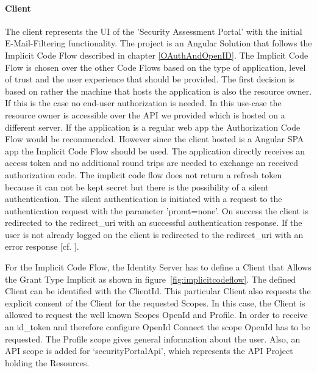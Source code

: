 \paragraph{Client}The client represents the UI of the 'Security Assessment Portal' with the initial E-Mail-Filtering functionality. The project is an Angular Solution that follows the Implicit Code Flow described in chapter \ref{OAuthAndOpenID}. The Implicit Code Flow is chosen over the other Code Flows based on the type of application, level of trust and the user experience that should be provided. The first decision is based on rather the machine that hosts the application is also the resource owner. If this is the case no end-user authorization is needed. In this use-case the resource owner is accessible over the API we provided which is hosted on a different server. If the application is a regular web app the Authorization Code Flow would be recommended. However since the client hosted is a Angular SPA app the Implicit Code Flow should be used. The application directly receives an access token and no additional round trips are needed to exchange an received authorization code. The implicit code flow does not return a refresh token because it can not be kept secret but there is the possibility of a silent authentication. The silent authentication is initiated with a request to the authentication request with the parameter 'promt=none'. On success the client is redirected to the redirect\_uri with an successful authentication response. If the user is not already logged on the client is redirected to the redirect\_uri with an error response [cf. \cite{OAuth:2018:Flow}].  


For the Implicit Code Flow, the Identity Server has to define a Client that Allows the Grant Type Implicit as shown in figure~\ref{fig:implicitcodeflow}. The defined Client can be identified with the ClientId. This particular Client also requests the explicit consent of the Client for the requested Scopes. In this case, the Client is allowed to request the well known Scopes OpenId and Profile. In order to receive an id\_token and therefore configure OpenId Connect the scope OpenId has to be requested. The Profile scope gives general information about the user. Also, an API scope is added for ‘securityPortalApi’, which represents the API Project holding the Resources. 

